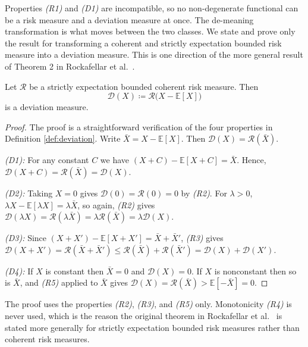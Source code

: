 Properties \emph{(R1)} and \emph{(D1)} are incompatible, so no non-degenerate functional can be a risk measure and a deviation
measure at once. The de-meaning transformation is what moves between the two classes. We state and prove only the result for transforming a coherent and strictly expectation bounded  risk measure into a deviation measure. This is one direction of the more general result of Theorem 2 in Rockafellar et al.~\cite{RockafellarUryasevZabarankin2006}.

\begin{theorem}\label{thm:demeaning}
Let $\mathcal{R}$ be a strictly expectation bounded coherent risk measure. Then
\begin{equation}
\mathcal{D}(X) \coloneqq \mathcal{R}\big(X - \mathbb{E}[X]\big)
\end{equation}
is a deviation measure.
\end{theorem}

\begin{proof}
The proof is a straightforward verification of the four properties in Definition \ref{def:deviation}.
Write $\bar X = X - \mathbb{E}[X]$. Then $\mathcal{D}(X) = \mathcal{R}(\bar X)$.

\emph{(D1):} For any constant $C$ we have $(X + C) - \mathbb{E}[X + C] = \bar X$. Hence,
$\mathcal{D}(X + C) = \mathcal{R}(\bar X) = \mathcal{D}(X)$.

\emph{(D2):} Taking $X = 0$ gives $\mathcal{D}(0) = \mathcal{R}(0) = 0$ by \emph{(R2)}. For $\lambda > 0$,
$\lambda X - \mathbb{E}[\lambda X] = \lambda \bar X$, so again, \emph{(R2)} gives
$\mathcal{D}(\lambda X) = \mathcal{R}(\lambda \bar X) = \lambda \mathcal{R}(\bar X) = \lambda \mathcal{D}(X)$.

\emph{(D3):} Since $(X + X') - \mathbb{E}[X + X'] = \bar X + \bar X'$, \emph{(R3)} gives
$\mathcal{D}(X + X') = \mathcal{R}(\bar X + \bar X') \leq \mathcal{R}(\bar X) + \mathcal{R}(\bar X')
= \mathcal{D}(X) + \mathcal{D}(X')$.

\emph{(D4):} If $X$ is constant then $\bar X = 0$ and $\mathcal{D}(X) = 0$. If $X$ is nonconstant then so
is $\bar X$, and \emph{(R5)} applied to $\bar X$ gives
$\mathcal{D}(X) = \mathcal{R}(\bar X) > \mathbb{E}[-\bar X] = 0$.
\end{proof}

The proof uses the properties \emph{(R2)}, \emph{(R3)}, and \emph{(R5)} only. Monotonicity \emph{(R4)} is never used, which is the reason the
original theorem in Rockafellar et al.~\cite{RockafellarUryasevZabarankin2006} is stated more generally for strictly expectation bounded risk
measures rather than coherent risk measures.

